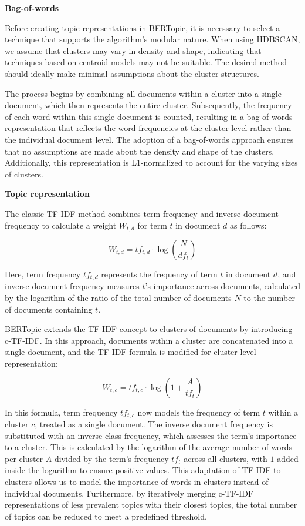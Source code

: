 \documentclass{article}
\begin{document}
\textbf{Bag-of-words}

Before creating topic representations in BERTopic, it is necessary to select a technique that supports the algorithm's modular nature. When using HDBSCAN, we assume that clusters may vary in density and shape, indicating that techniques based on centroid models may not be suitable. The desired method should ideally make minimal assumptions about the cluster structures.

The process begins by combining all documents within a cluster into a single document, which then represents the entire cluster. Subsequently, the frequency of each word within this single document is counted, resulting in a bag-of-words representation that reflects the word frequencies at the cluster level rather than the individual document level. The adoption of a bag-of-words approach ensures that no assumptions are made about the density and shape of the clusters. Additionally, this representation is L1-normalized to account for the varying sizes of clusters.

\textbf{Topic representation}

The classic TF-IDF \cite{joachims_probabilistic_1997} method combines term frequency and inverse document frequency to calculate a weight $W_{t,d}$ for term $t$ in document $d$ as follows:

\[ W_{t,d} = tf_{t,d} \cdot \log\left(\frac{N}{df_t}\right) \]

Here, term frequency $tf_{t,d}$ represents the frequency of term $t$ in document $d$, and inverse document frequency measures $t$'s importance across documents, calculated by the logarithm of the ratio of the total number of documents $N$ to the number of documents containing $t$.


BERTopic extends the TF-IDF concept to clusters of documents by introducing c-TF-IDF. In this approach, documents within a cluster are concatenated into a single document, and the TF-IDF formula is modified for cluster-level representation:

\[ W_{t,c} = tf_{t,c} \cdot \log\left(1 + \frac{A}{tf_t}\right) \]

In this formula, term frequency $tf_{t,c}$ now models the frequency of term $t$ within a cluster $c$, treated as a single document. The inverse document frequency is substituted with an inverse class frequency, which assesses the term's importance to a cluster. This is calculated by the logarithm of the average number of words per cluster $A$ divided by the term's frequency $tf_t$ across all clusters, with $1$ added inside the logarithm to ensure positive values. This adaptation of TF-IDF to clusters allows us to model the importance of words in clusters instead of individual documents. Furthermore, by iteratively merging c-TF-IDF representations of less prevalent topics with their closest topics, the total number of topics can be reduced to meet a predefined threshold.
\end{document}
